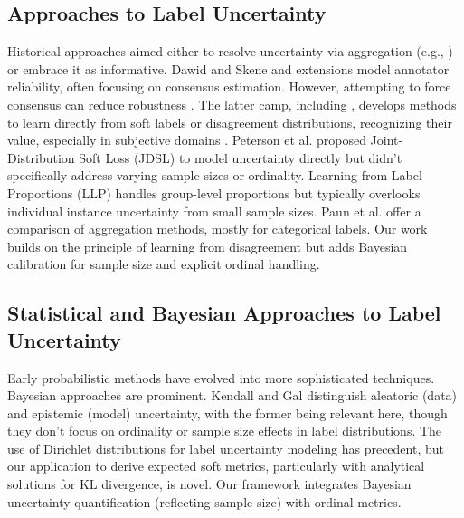 \documentclass[journal]{IEEEtran}
\begin{document}
\subsection{Approaches to Label Uncertainty}
Historical approaches aimed either to resolve uncertainty via aggregation (e.g., \cite{dawid1979, paun2022}) or embrace it as informative. Dawid and Skene \cite{dawid1979} and extensions \cite{raykar2010} model annotator reliability, often focusing on consensus estimation. However, attempting to force consensus can reduce robustness \cite{peterson2019}. The latter camp, including \cite{sommerauer2020, fornaciari2021, uma2021}, develops methods to learn directly from soft labels or disagreement distributions, recognizing their value, especially in subjective domains \cite{demszky2020}. Peterson et al. \cite{peterson2019} proposed Joint-Distribution Soft Loss (JDSL) to model uncertainty directly but didn't specifically address varying sample sizes or ordinality. Learning from Label Proportions (LLP) \cite{quadrianto2009} handles group-level proportions but typically overlooks individual instance uncertainty from small sample sizes. Paun et al. \cite{paun2018} offer a comparison of aggregation methods, mostly for categorical labels. Our work builds on the principle of learning from disagreement but adds Bayesian calibration for sample size and explicit ordinal handling.

\subsection{Statistical and Bayesian Approaches to Label Uncertainty}
Early probabilistic methods \cite{smyth1995} have evolved into more sophisticated techniques. Bayesian approaches \cite{gordon2021, li2019} are prominent. Kendall and Gal \cite{kendall2017} distinguish aleatoric (data) and epistemic (model) uncertainty, with the former being relevant here, though they don't focus on ordinality or sample size effects in label distributions. The use of Dirichlet distributions for label uncertainty modeling \cite{archambeau2016} has precedent, but our application to derive expected soft metrics, particularly with analytical solutions for KL divergence, is novel. Our framework integrates Bayesian uncertainty quantification (reflecting sample size) with ordinal metrics.
\end{document}
